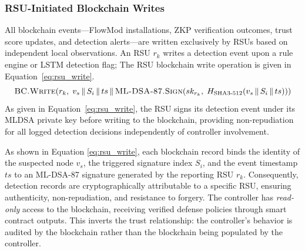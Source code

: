 \documentclass[12pt, a4paper]{report}
\begin{document}
\subsubsection{RSU-Initiated Blockchain Writes}
All blockchain events---FlowMod installations, ZKP verification
outcomes, trust score updates, and detection alerts---are written
exclusively by RSUs based on independent local observations. An
RSU $r_k$ writes a detection event upon a rule engine or LSTM
detection flag;
The \ac{RSU} blockchain write operation is given
in Equation~\eqref{eq:rsu_write}.
\begin{equation}
\textsc{BC.Write}\!\left(r_k,\;
v_s \,\|\, S_i \,\|\, ts \,\|\,
\textsc{ML-DSA-87.Sign}\!\left(
sk_{r_k},\;
H_{\text{SHA3-512}}\!\left(
v_s \,\|\, S_i \,\|\, ts
\right)\right)\right)
\label{eq:rsu_write}
\end{equation}
As given in Equation~\eqref{eq:rsu_write}, the
\ac{RSU} signs its detection event under its
\ac{MLDSA} private key before writing to the
blockchain, providing non-repudiation for all
logged detection decisions independently of
controller involvement.

As shown in Equation \eqref{eq:rsu_write}, each blockchain record binds the identity of the suspected node $v_s$, the triggered signature index $S_i$, and the event timestamp $ts$ to an ML-DSA-87 signature generated by the reporting RSU $r_k$. Consequently, detection records are cryptographically attributable to a specific RSU, ensuring authenticity, non-repudiation, and resistance to forgery.
The controller has \emph{read-only} access to the blockchain,
receiving verified defense policies through smart contract outputs.
This inverts the trust relationship: the controller's behavior is
audited by the blockchain rather than the blockchain being
populated by the controller.
\end{document}
